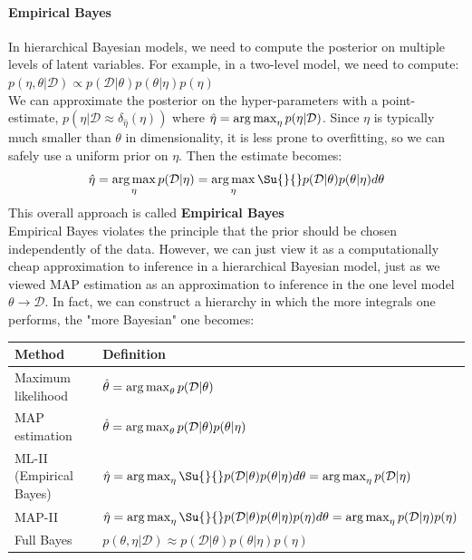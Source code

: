 \paragraph{Empirical Bayes}
In hierarchical Bayesian models, we need to compute the posterior on multiple levels of
latent variables. For example, in a two-level model, we need to compute:
$p(\eta, \theta|\mathcal{D}) \propto p(\mathcal{D}|\theta)p(\theta|\eta)p(\eta)$\\
We can approximate the posterior on the hyper-parameters with a point-estimate, 
$p(\eta|\mathcal{D}\approx \delta_{\hat{\eta}}(\eta))$ where $\hat{\eta}=\operatorname*{arg\,max}_{\eta}
p(\eta|\mathcal{D})$. Since $\eta$ is typically much smaller than $\theta$ in 
dimensionality, it is less prone to overfitting, so we can safely use a uniform prior on 
$\eta$. Then the estimate becomes: 
$$ \hat{\eta} = \argmax_{\eta} p(\mathcal{D}|\eta) = \argmax_{\eta} \Su{}{}
p(\mathcal{D}|\theta)p(\theta|\mathcal{\eta})d\theta $$
This overall approach is called \textbf{Empirical Bayes}\\
Empirical Bayes violates the principle that the prior should be chosen independently of 
the data. However, we can just view it as a computationally cheap approximation to 
inference in a hierarchical Bayesian model, just as we viewed MAP estimation as an approximation to inference in the one level model $\theta \rightarrow \mathcal{D}$. In fact, we
can construct a hierarchy in which the more integrals one performs, the "more Bayesian" 
one becomes:
\begin{center}
	\begin{tabular}{|*{2}{l|}}
		\hline
		\textbf{Method} & \textbf{Definition} \\
		\hline
		Maximum likelihood & $\hat{\theta} = \operatorname*{arg\,max}_{\theta} 
		p(\mathcal{D}|\theta)$ \\
		\hline
		MAP estimation & $\hat{\theta} = \operatorname*{arg\,max}_{\theta} 
		p(\mathcal{D}|\theta)p(\theta|\eta)$ \\
		ML-II (Empirical Bayes) & $\hat{\eta}=\argmax_{\eta}\Su{}{}
		p(\mathcal{D}|\theta)p(\theta|\eta)d\theta = \argmax_{\eta}p(\mathcal{D}|
		\eta)$ \\
		\hline
		MAP-II & $\hat{\eta}=\argmax_{\eta}\Su{}{}
		p(\mathcal{D}|\theta)p(\theta|\eta)p(\eta)d\theta = \argmax_{\eta}p(
		\mathcal{D}| \eta)p(\eta)$\\
		\hline
		Full Bayes & $p(\theta, \eta|\mathcal{D}) \approx p(\mathcal{D}|\theta)
		p(\theta|\eta)p(\eta)$\\
		\hline
	\end{tabular}
\end{center}

